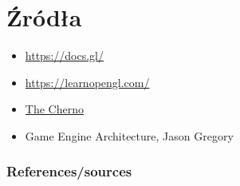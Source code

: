 \documentclass{beamer}
\begin{document}
    \section{Źródła}
\begin{frame}
    \begin{itemize}
        \item \href{https://docs.gl/}{https://docs.gl/}
    \item \href{https://learnopengl.com/}{https://learnopengl.com/}
    \item \href{https://www.youtube.com/c/gameengineseries}{The Cherno}
    \item Game Engine Architecture, Jason Gregory
    \end{itemize}
    \frametitle{References/sources}
    \end{frame}
\end{document}
